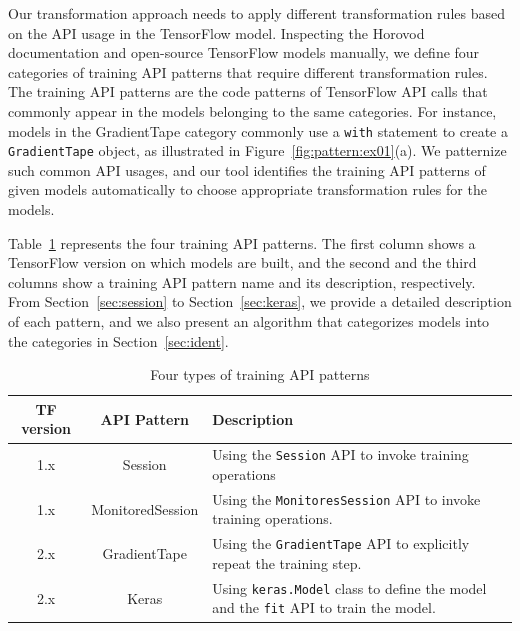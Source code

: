 Our transformation approach needs to apply different transformation rules based
on the API usage in the TensorFlow model. 
Inspecting the Horovod documentation and open-source TensorFlow models
manually, we define four categories of training API patterns that require
different transformation rules. 
The training API patterns are the code patterns of TensorFlow API calls that
commonly appear in the models belonging to the same categories.
For instance, models in the {GradientTape} category commonly use a {\tt with}
statement to create a {\tt GradientTape} object, as illustrated in
Figure~\ref{fig:pattern:ex01}(a).
We patternize such common API usages, and our tool identifies the training API
patterns of given models automatically to choose appropriate transformation
rules for the models.

Table~\ref{tab:patterns} represents the four training API patterns. 
The first column shows a TensorFlow version on which models are built, and the
second and the third columns show a training API pattern name and its
description, respectively.
From Section~\ref{sec:session} to Section~\ref{sec:keras}, we provide a
detailed description of each pattern, and we also present an algorithm that
categorizes models into the categories in Section~\ref{sec:ident}.


\begin{table}[ht!]
  \centering
  \begin{tabular}{|c|c|l|}
    \hline
    TF version & API Pattern & Description \\
    \hline
    1.x & Session & 
	  Using the {\tt Session} API to invoke training operations\\
    \hline
    1.x & MonitoredSession & 
      Using the {\tt MonitoresSession} API to invoke training operations.\\
    \hline
    2.x & GradientTape & 
      Using the {\tt GradientTape} API to explicitly repeat the training
      step.\\
    \hline
    2.x & Keras & 
      Using {\tt keras.Model} class to define the model and the {\tt fit} API
      to train the model.\\
    \hline
  \end{tabular}
  \caption{Four types of training API patterns}
  \label{tab:patterns}
\end{table}

